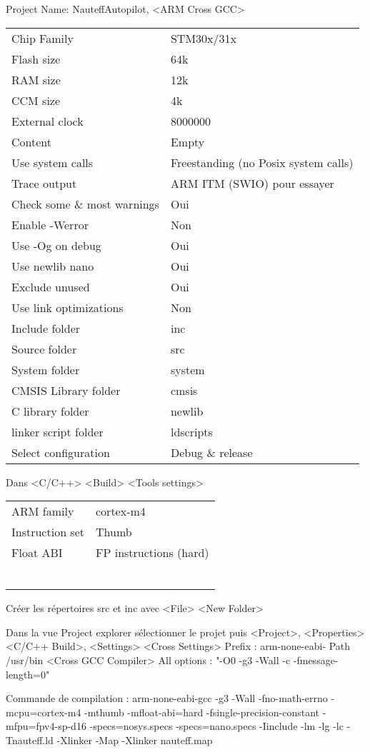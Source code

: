 \documentclass[a4paper,11pt]{report}
\begin{document}
Project Name: NauteffAutopilot, <ARM Cross GCC>\\
\begin{tabular}{|l|l|}
	\hline 
	Chip Family &  STM30x/31x\\ 
	Flash size & 64k \\ 
	RAM size &  12k \\ 
	CCM size &  4k \\ 
	External clock&   8000000\\ 
	Content & Empty \\ 
	Use system calls & Freestanding (no Posix system calls) \\ 
	Trace output & ARM ITM (SWIO) pour essayer \\ 
	Check some \& most warnings & Oui \\ 
	Enable -Werror & Non \\ 
	Use -Og on debug & Oui \\ 
	Use newlib nano &  Oui\\ 
	Exclude unused & Oui \\ 
	Use link optimizations & Non \\ 
	Include folder & inc\\
	Source folder & src\\
	System folder & system\\
	CMSIS Library folder & cmsis \\
	C library folder & newlib\\
	linker script folder & ldscripts\\
	Select configuration & Debug \& release \\
	\hline 
\end{tabular} 
Dans <C/C++> <Build> <Tools settings>
\begin{tabular}{|l|l|}
	\hline 
	ARM family & cortex-m4\\ 
	Instruction set & Thumb\\ 
	Float ABI & FP instructions (hard)\\ 
	& \\ 
	& \\ 
	& \\ 
	& \\ 
	& \\ 
	& \\ 
	\hline 
\end{tabular} 




Créer les répertoires src et inc avec <File> <New Folder>

Dans la vue Project explorer sélectionner le projet puis <Project>, <Properties>
<C/C++ Build>, <Settings>
<Cross Settings> Prefix : arm-none-eabi- Path /usr/bin
<Cross GCC Compiler> All options : "-O0 -g3 -Wall -c -fmessage-length=0"


Commande de compilation :
arm-none-eabi-gcc -g3 -Wall -fno-math-errno -mcpu=cortex-m4 -mthumb -mfloat-abi=hard -fsingle-precision-constant -mfpu=fpv4-sp-d16 -specs=nosys.specs -specs=nano.specs -Iinclude -lm -lg -lc -Tnauteff.ld -Xlinker -Map -Xlinker nauteff.map
\end{document}
